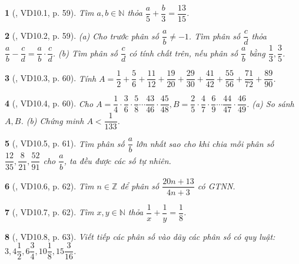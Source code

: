 \documentclass{article}
\newtheorem{baitoan}{}
\begin{document}
\begin{baitoan}[\cite{TLCT_THCS_Toan_6_so_hoc}, VD10.1, p. 59]
	Tìm $a,b\in\mathbb{N}$ thỏa $\dfrac{a}{5} + \dfrac{b}{3} = \dfrac{13}{15}$.
\end{baitoan}

\begin{baitoan}[\cite{TLCT_THCS_Toan_6_so_hoc}, VD10.2, p. 59]
	(a) Cho trước phân số $\dfrac{a}{b}\ne-1$. Tìm phân số $\dfrac{c}{d}$ thỏa $\dfrac{a}{b} - \dfrac{c}{d} = \dfrac{a}{b}\cdot\dfrac{c}{d}$. (b) Tìm phân số $\dfrac{c}{d}$ có tính chất trên, nếu phân số $\dfrac{a}{b}$ bằng $\dfrac{1}{3},\dfrac{3}{5}$.
\end{baitoan}

\begin{baitoan}[\cite{TLCT_THCS_Toan_6_so_hoc}, VD10.3, p. 60]
	Tính $A = \dfrac{1}{2} + \dfrac{5}{6} + \dfrac{11}{12} + \dfrac{19}{20} + \dfrac{29}{30} + \dfrac{41}{42} + \dfrac{55}{56} + \dfrac{71}{72} + \dfrac{89}{90}$.
\end{baitoan}

\begin{baitoan}[\cite{TLCT_THCS_Toan_6_so_hoc}, VD10.4, p. 60]
	Cho $A = \dfrac{1}{4}\cdot\dfrac{3}{6}\cdot\dfrac{5}{8}\cdots\dfrac{43}{46}\cdot\dfrac{45}{48},B = \dfrac{2}{5}\cdot\dfrac{4}{7}\cdot\dfrac{6}{9}\cdots\dfrac{44}{47}\cdot\dfrac{46}{49}$. (a) So sánh $A,B$. (b) Chứng minh $A < \dfrac{1}{133}$.
\end{baitoan}

\begin{baitoan}[\cite{TLCT_THCS_Toan_6_so_hoc}, VD10.5, p. 61]
	Tìm phân số $\dfrac{a}{b}$ lớn nhất sao cho khi chia mỗi phân số $\dfrac{12}{35},\dfrac{8}{21},\dfrac{52}{91}$ cho $\dfrac{a}{b}$, ta đều được các số tự nhiên.
\end{baitoan}

\begin{baitoan}[\cite{TLCT_THCS_Toan_6_so_hoc}, VD10.6, p. 62]
	Tìm $n\in\mathbb{Z}$ để phân số $\dfrac{20n + 13}{4n + 3}$ có {\rm GTNN}.
\end{baitoan}

\begin{baitoan}[\cite{TLCT_THCS_Toan_6_so_hoc}, VD10.7, p. 62]
	Tìm $x,y\in\mathbb{N}$ thỏa $\dfrac{1}{x} + \dfrac{1}{y} = \dfrac{1}{8}$.
\end{baitoan}

\begin{baitoan}[\cite{TLCT_THCS_Toan_6_so_hoc}, VD10.8, p. 63]
	Viết tiếp các phân số vào dãy các phân số có quy luật: $3,4\dfrac{1}{2},6\dfrac{3}{4},10\dfrac{1}{8},15\dfrac{3}{16}$.
\end{baitoan}
\end{document}
